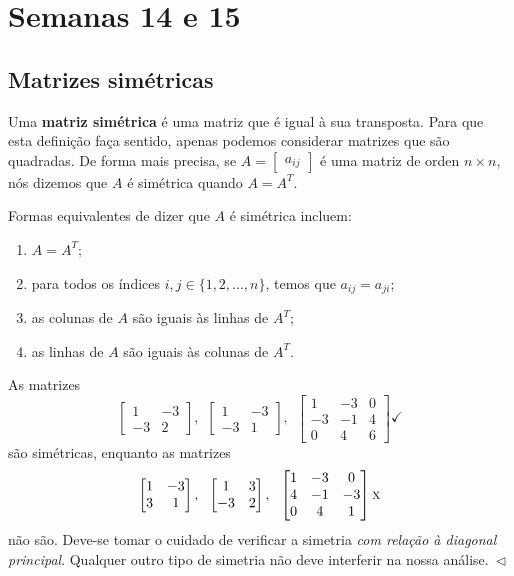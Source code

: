 \documentclass[../livro.tex]{subfiles}
\begin{document}
\chapter{Semanas 14 e 15}

\section{Matrizes simétricas}

Uma \textbf{matriz simétrica} é uma matriz que é igual à sua transposta. Para que esta definição faça sentido, apenas podemos considerar matrizes que são quadradas. De forma mais precisa, se $A = \begin{bmatrix} a_{ij} \end{bmatrix}$ é uma matriz de orden $n \times n$, nós dizemos que $A$ é simétrica quando $A = A^T$.

Formas equivalentes de dizer que $A$ é simétrica incluem:
\begin{enumerate}[$(1)$]
	\item $A = A^T$;
	\item para todos os índices $i,j \in \{1,2,\dots,n\}$, temos que $a_{ij} = a_{ji}$;
	\item as colunas de $A$ são iguais às linhas de $A^T$;
	\item as linhas de $A$ são iguais às colunas de $A^T$.
\end{enumerate}

\begin{example}
	As matrizes
	\[
	\begin{bmatrix}
	1 & -3 \\
	-3 &  2
	\end{bmatrix}, \ \ 
	\begin{bmatrix}
	1 & -3 \\
	-3 &  1
	\end{bmatrix}, \ \ 
	\begin{bmatrix}
	1 & -3 & 0 \\
	-3 & -1 & 4 \\
	0 &  4 & 6
	\end{bmatrix} \checkmark
	\] são simétricas, enquanto  as matrizes
	\[
	\begin{bmatrix}
	1 & -3 \\
	3 &  1
	\end{bmatrix},\ \ 
	\begin{bmatrix}
	1 &  3 \\
	-3 &  2
	\end{bmatrix},\ \ 
	\begin{bmatrix}
	1 & -3 &  0 \\
	4 & -1 & -3 \\
	0 &  4 &  1
	\end{bmatrix} \textsc{x}
	\] não são. Deve-se tomar o cuidado de verificar a simetria \textit{com relação à diagonal principal}. Qualquer outro tipo de simetria não deve interferir na nossa análise$. \ \lhd$
\end{example}
\end{document}
